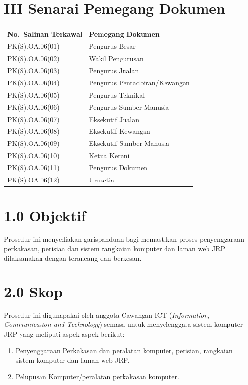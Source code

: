 \documentclass[
]{article}
\begin{document}
\hypertarget{iii-senarai-pemegang-dokumen}{%
\section{III Senarai Pemegang
Dokumen}\label{iii-senarai-pemegang-dokumen}}

\begin{longtable}[]{@{}ll@{}}
\toprule
No.~Salinan Terkawal & Pemegang Dokumen\tabularnewline
\midrule
\endhead
PK(S).OA.06(01) & Pengurus Besar\tabularnewline
PK(S).OA.06(02) & Wakil Pengurusan\tabularnewline
PK(S).OA.06(03) & Pengurus Jualan\tabularnewline
PK(S).OA.06(04) & Pengurus Pentadbiran/Kewangan\tabularnewline
PK(S).OA.06(05) & Pengurus Teknikal\tabularnewline
PK(S).OA.06(06) & Pengurus Sumber Manusia\tabularnewline
PK(S).OA.06(07) & Eksekutif Jualan\tabularnewline
PK(S).OA.06(08) & Eksekutif Kewangan\tabularnewline
PK(S).OA.06(09) & Eksekutif Sumber Manusia\tabularnewline
PK(S).OA.06(10) & Ketua Kerani\tabularnewline
PK(S).OA.06(11) & Pengurus Dokumen\tabularnewline
PK(S).OA.06(12) & Urusetia\tabularnewline
\bottomrule
\end{longtable}

\hypertarget{objektif}{%
\section{1.0 Objektif}\label{objektif}}

Prosedur ini menyediakan garispanduan bagi memastikan proses
penyenggaraan perkakasan, perisian dan sistem rangkaian komputer dan
laman web JRP dilaksanakan dengan terancang dan berkesan.

\hypertarget{skop}{%
\section{2.0 Skop}\label{skop}}

Prosedur ini digunapakai oleh anggota Cawangan ICT (\emph{Information,
Communication and Technology}) semasa untuk menyelenggara sistem
komputer JRP yang meliputi aspek-aspek berikut:

\begin{enumerate}
\def\labelenumi{\roman{enumi})}
\item
  Penyenggaraan Perkakasan dan peralatan komputer, perisian, rangkaian
  sistem komputer dan laman web JRP.
\item
  Pelupusan Komputer/peralatan perkakasan komputer.
\end{enumerate}
\end{document}
